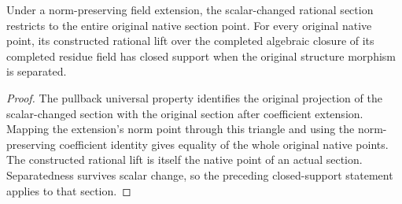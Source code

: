 \begin{lemma}
\label{lem:fc-rational-section-scalar-restriction}
\leanok
Under a norm-preserving field extension, the scalar-changed rational section
restricts to the entire original native section point. For every original
native point, its constructed rational lift over the completed algebraic
closure of its completed residue field has closed support when the original
structure morphism is separated.
\end{lemma}
\begin{proof}
The pullback universal property identifies the original projection of the
scalar-changed section with the original section after coefficient extension.
Mapping the extension's norm point through this triangle and using the
norm-preserving coefficient identity gives equality of the whole original
native points. The constructed rational lift is itself the native point of
an actual section. Separatedness survives scalar change, so the preceding
closed-support statement applies to that section.
\end{proof}
